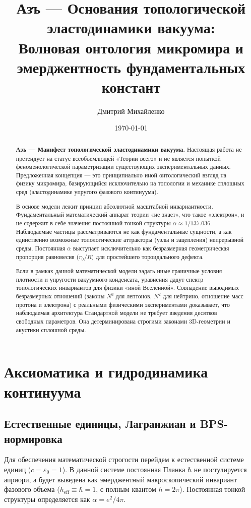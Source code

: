 \documentclass[11pt,a4paper]{article}
\title{\textbf{Азъ — Основания топологической эластодинамики вакуума:\\ Волновая онтология микромира и эмерджентность фундаментальных констант}}
\author{Дмитрий Михайленко}
\date{\today}
\begin{document}
	
	\maketitle

\begin{abstract}
\textbf{Азъ — Манифест топологической эластодинамики вакуума.} 
Настоящая работа не претендует на статус всеобъемлющей «Теории всего» и не является попыткой феноменологической параметризации существующих экспериментальных данных. Предложенная концепция — это принципиально иной онтологический взгляд на физику микромира, базирующийся исключительно на топологии и механике сплошных сред (эластодинамике упругого фазового континуума).

В основе модели лежит принцип абсолютной масштабной инвариантности. Фундаментальный математический аппарат теории «не знает», что такое «электрон», и не содержит в себе значения постоянной тонкой структуры $\alpha \approx 1/137.036$. Наблюдаемые частицы рассматриваются не как фундаментальные сущности, а как единственно возможные топологические аттракторы (узлы и зацепления) непрерывной среды. Постоянная $\alpha$ выступает исключительно как безразмерная геометрическая пропорция равновесия ($r_0/R$) для простейшего тороидального дефекта. 

Если в рамках данной математической модели задать иные граничные условия плотности и упругости вакуумного конденсата, уравнения дадут спектр топологических инвариантов для физики «иной Вселенной». Совпадение выводимых безразмерных отношений (законы $N^3$ для лептонов, $N^2$ для нейтрино, отношение масс протона и электрона) с реальными физическими экспериментами доказывает, что наблюдаемая архитектура Стандартной модели не требует введения десятков свободных параметров. Она детерминирована строгими законами 3D-геометрии и акустики сплошной среды.
\end{abstract}

\section{Аксиоматика и гидродинамика континуума}

\subsection{Естественные единицы, Лагранжиан и BPS-нормировка}
Для обеспечения математической строгости перейдем к естественной системе единиц ($c = \varepsilon_0 = 1$). В данной системе постоянная Планка $\hbar$ не постулируется априори, а будет выведена как эмерджентный макроскопический инвариант фазового объема ($h_{\text{eff}} \equiv \hbar = 1$, с полным квантом $h = 2\pi$). Постоянная тонкой структуры определяется как $\alpha = e^2 / 4\pi$.
\end{document}

